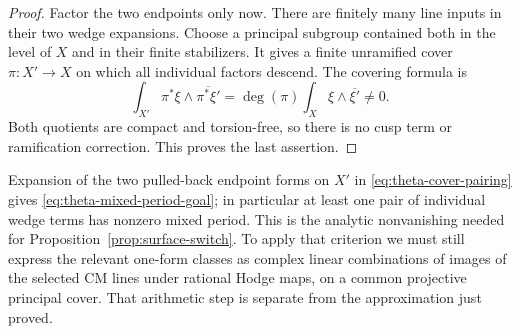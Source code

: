 \begin{proof}
Factor the two endpoints only now.  There are finitely many
line inputs in their two wedge expansions.  Choose a principal
subgroup contained both in the level of \(X\) and in their
finite stabilizers.  It gives a finite unramified cover
\(\pi:X'\to X\) on which all individual factors descend.
The covering formula is
\begin{equation}\label{eq:theta-cover-pairing}
 \int_{X'}\pi^*\xi\wedge\overline{\pi^*\xi'}
       =\deg(\pi)\int_X\xi\wedge\overline{\xi'}\ne0.
\end{equation}
Both quotients are compact and torsion-free, so there is no
cusp term or ramification correction.  This proves the last
assertion.
\end{proof}

Expansion of the two pulled-back endpoint forms on \(X'\) in
\eqref{eq:theta-cover-pairing} gives
\eqref{eq:theta-mixed-period-goal}; in particular at least one
pair of individual wedge terms has nonzero mixed period.
This is the analytic nonvanishing needed for
Proposition~\ref{prop:surface-switch}.
To apply that criterion
we must still express the relevant one-form classes as complex
linear combinations of images of the selected CM lines under
rational Hodge maps, on a common projective principal cover.
That arithmetic step is separate from the approximation just
proved.
